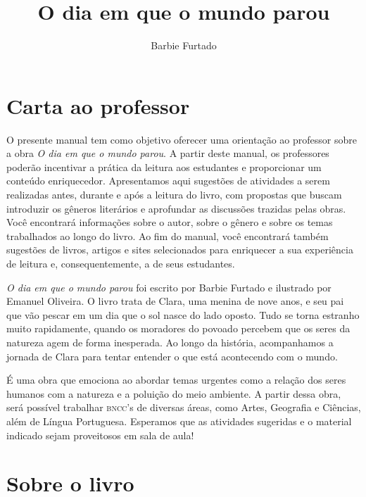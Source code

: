 \documentclass[11pt]{extarticle}
\newcommand{\AutorLivro}{Barbie Furtado}
\newcommand{\TituloLivro}{O dia em que o mundo parou}
\newcommand{\colaborador}{Ana Lancman}
\begin{document}
\title{\TituloLivro}
\author{\AutorLivro}
\def\authornotes{\colaborador}

\date{}
\maketitle


\tableofcontents

\section{Carta ao professor}

O presente manual tem como objetivo oferecer uma orientação ao professor sobre a obra \textit{O dia em que o mundo parou}. A partir deste manual, os professores poderão incentivar a prática da leitura aos estudantes e proporcionar um conteúdo enriquecedor. Apresentamos aqui sugestões de atividades a serem realizadas antes, durante e após a leitura do livro, com propostas que buscam introduzir os gêneros literários e aprofundar as discussões trazidas pelas obras. Você encontrará informações sobre o autor, sobre o gênero e sobre os temas trabalhados ao longo do livro. Ao fim do manual, você encontrará também sugestões de livros, artigos e sites selecionados para enriquecer a sua experiência de leitura e, consequentemente, a de seus estudantes.

\textit{O dia em que o mundo parou} foi escrito por Barbie Furtado e ilustrado por Emanuel Oliveira. O livro trata de Clara, uma menina de nove anos, e seu pai que vão pescar em um dia que o sol nasce do lado oposto. Tudo se torna estranho muito rapidamente, quando os moradores do povoado percebem que os seres da natureza agem de forma inesperada. Ao longo da história, acompanhamos a jornada de Clara para tentar entender o que está acontecendo com o mundo.

É uma obra que emociona ao abordar temas urgentes como a relação dos seres humanos com a natureza e a poluição do meio ambiente. A partir dessa obra, será possível trabalhar \textsc{bncc}'s de diversas áreas, como Artes, Geografia e Ciências, além de Língua Portuguesa. Esperamos que as atividades sugeridas e o material indicado sejam proveitosos em sala de aula! 

\section{Sobre o livro}
\end{document}
